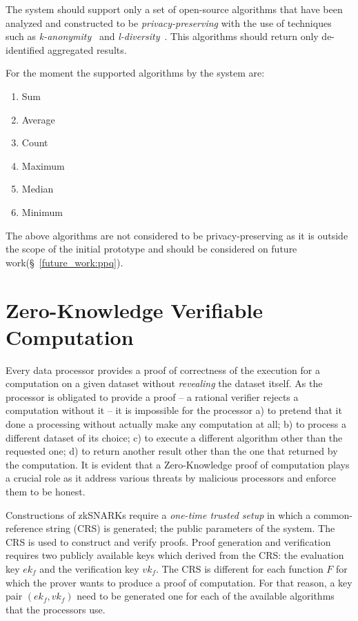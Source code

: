 The system should support only a set of open-source algorithms that have been analyzed and constructed to be  \textit{privacy-preserving} with the use of techniques such as \textit{k-anonymity}~\cite{Samarati98protectingprivacy} and \textit{l-diversity}~\cite{Aggarwal2008}. This algorithms should return only de-identified aggregated results.

For the moment the supported algorithms by the system are:

\begin{enumerate}
  \item Sum
  \item Average
  \item Count
  \item Maximum
  \item Median
  \item Minimum
\end{enumerate}

The above algorithms are not considered to be privacy-preserving as it is outside the scope of the initial prototype and should be considered on future work(§~\ref{future_work:ppq}).

\section{Zero-Knowledge Verifiable Computation}
\label{solution:proof}

Every data processor provides a proof of correctness of the execution for a computation on a given dataset without \textit{revealing} the dataset itself. As the processor is obligated to provide a proof -- a rational verifier rejects a computation without it -- it is impossible for the processor a) to pretend that it done a processing without actually make any computation at all; b) to process a different dataset of its choice; c) to execute a different algorithm other than the requested one; d) to return another result other than the one that returned by the computation. It is evident that a Zero-Knowledge proof of computation plays a crucial role as it address various threats by malicious processors and enforce them to be honest.

Constructions of zkSNARKs require a \textit{one-time trusted setup} in which a common-reference string (CRS) is generated; the public parameters of the system. The CRS is used to construct and verify proofs. Proof generation and verification requires two publicly available keys which derived from the CRS: the evaluation key $ek_f$ and the verification key $vk_f$. The CRS is different for each function $F$ for which the prover wants to produce a proof of computation. For that reason, a key pair $(ek_f, vk_f)$ need to be generated one for each of the available algorithms that the processors use.


